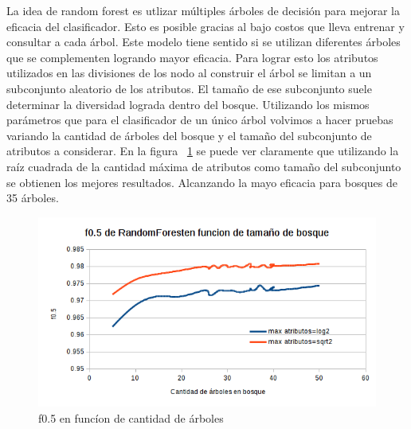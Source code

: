 
La idea de random forest es utlizar múltiples árboles de decisión para mejorar la eficacia del clasificador. Esto es posible gracias al bajo costos que lleva entrenar y consultar a cada árbol. Este modelo tiene sentido si se utilizan diferentes árboles que se complementen logrando mayor eficacia. Para lograr esto los atributos utilizados en las divisiones de los nodo al construir el árbol se limitan a un subconjunto aleatorio de los atributos. El tamaño de ese subconjunto suele determinar la diversidad lograda dentro del bosque. Utilizando los mismos parámetros que para el clasificador de un único árbol volvimos a hacer pruebas variando la cantidad de árboles del bosque y el tamaño del subconjunto de atributos a considerar. En la figura ~\ref{fig:forest_f05_en_funcion_de_cantidad_de_arboles} se puede ver claramente que utilizando la raíz cuadrada de la cantidad máxima de atributos como tamaño del subconjunto se obtienen los mejores resultados. Alcanzando la mayo eficacia para bosques de 35 árboles. 


\begin{figure}[H]
    \centering
        \includegraphics[width=\textwidth]{plots/forest_f05_en_funcion_de_cantidad_de_arboles.png}
        \caption{f0.5 en funcíon de cantidad de árboles}
        \label{fig:forest_f05_en_funcion_de_cantidad_de_arboles}
\end{figure}

